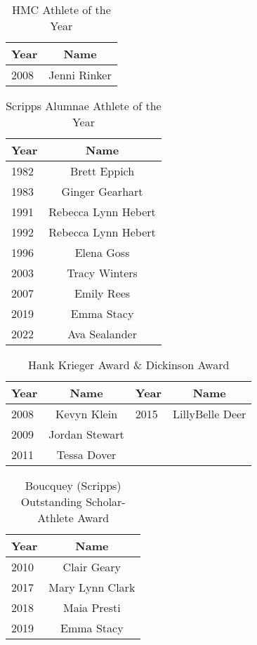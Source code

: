 \begin{table}[htbp]
\centering
\caption*{HMC Athlete of the Year}
\begin{tabular}{lc}
\toprule
Year & Name \\
\midrule
2008 & Jenni Rinker \\
\bottomrule
\end{tabular}
\end{table}

\begin{table}[htbp]
\centering
\caption*{Scripps Alumnae Athlete of the Year}
\begin{tabular}{lc}
\toprule
Year & Name \\
\midrule
1982 & Brett Eppich \\
1983 & Ginger Gearhart \\
1991 & Rebecca Lynn Hebert \\
1992 & Rebecca Lynn Hebert \\
1996 & Elena Goss \\
2003 & Tracy Winters \\
2007 & Emily Rees \\
2019 & Emma Stacy \\
2022 & Ava Sealander \\
\bottomrule
\end{tabular}
\end{table}

\begin{table}[htbp]
\centering
\caption*{Hank Krieger Award \& Dickinson Award}
\begin{tabular}{lclc}
\toprule
Year & Name & Year & Name \\
\midrule
2008 & Kevyn Klein & 2015 & LillyBelle Deer \\
2009 & Jordan Stewart & & \\
2011 & Tessa Dover & & \\
\bottomrule
\end{tabular}
\end{table}

\begin{table}[htbp]
\centering
\caption*{Boucquey (Scripps) Outstanding Scholar-Athlete Award}
\begin{tabular}{lc}
\toprule
Year & Name \\
\midrule
2010 & Clair Geary \\
2017 & Mary Lynn Clark \\
2018 & Maia Presti \\
2019 & Emma Stacy \\
\bottomrule
\end{tabular}
\end{table}

